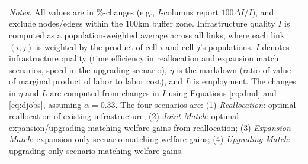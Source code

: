 \documentclass[a4paper]{article}
\begin{document}
\begin{table}[ht]
{\begin{tabular}{lrrrrrrrrrrrr}
\multicolumn{13}{l}{\parbox{1.1\textwidth}{\scriptsize
\textit{Notes:} All values are in \%-changes (e.g., $I$-columns report $100 \Delta I/I$), and exclude nodes/edges within the 100km buffer zone. Infrastructure quality $I$ is computed as a population-weighted average across all links, where each link $(i,j)$ is weighted by the product of cell $i$ and cell $j$'s populations. $I$ denotes infrastructure quality (time efficiency in reallocation and expansion match scenarios, speed in the upgrading scenario), $\eta$ is the markdown (ratio of value of marginal product of labor to labor cost), and $L$ is employment. The changes in $\eta$ and $L$ are computed from changes in $I$ using Equations \ref{eq:dmd} and \ref{eq:djobs}, assuming $\alpha = 0.33$. The four scenarios are: (1) \textit{Reallocation}: optimal reallocation of existing infrastructure; (2) \textit{Joint Match}: optimal expansion/upgrading matching welfare gains from reallocation; (3) \textit{Expansion Match}: expansion-only scenario matching welfare gains; (4) \textit{Upgrading Match}: upgrading-only scenario matching welfare gains.}} %
\end{tabular}
}
\end{table}
\end{document}
